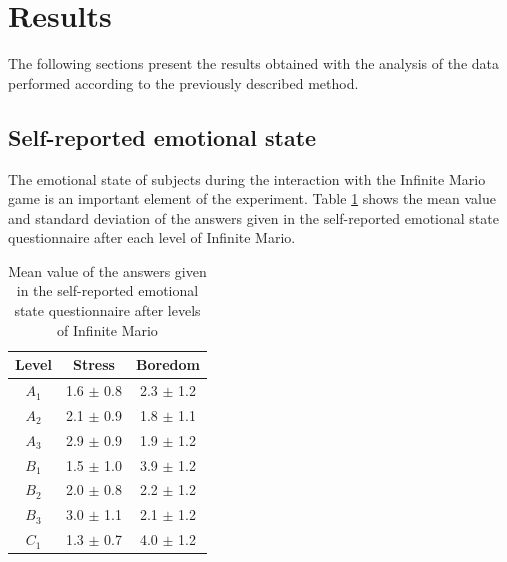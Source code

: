 
\section{Results}

The following sections present the results obtained with the analysis of the data performed according to the previously described method.

\subsection{Self-reported emotional state}

The emotional state of subjects during the interaction with the Infinite Mario game is an important element of the experiment. Table \ref{table:experiment2-mario-emotions} shows the mean value and standard deviation of the answers given in the self-reported emotional state questionnaire after each level of Infinite Mario.

\begin{table}[!htbp]
  \centering
  \caption{Mean value of the answers given in the self-reported emotional state questionnaire after levels of Infinite Mario}
  \label{table:experiment2-mario-emotions}
  \begin{tabular}{ccc}
    \hline
      \textbf{Level} & \textbf{Stress} & \textbf{Boredom} \\
    \hline
      $A_1$ & 1.6 $\pm$ 0.8 & 2.3 $\pm$ 1.2 \\
      $A_2$ & 2.1 $\pm$ 0.9 & 1.8 $\pm$ 1.1 \\
      $A_3$ & 2.9 $\pm$ 0.9 & 1.9 $\pm$ 1.2 \\
      $B_1$ & 1.5 $\pm$ 1.0 & 3.9 $\pm$ 1.2 \\
      $B_2$ & 2.0 $\pm$ 0.8 & 2.2 $\pm$ 1.2 \\
      $B_3$ & 3.0 $\pm$ 1.1 & 2.1 $\pm$ 1.2 \\
      $C_1$ & 1.3 $\pm$ 0.7 & 4.0 $\pm$ 1.2 \\
    \hline
  \end{tabular}
\end{table}

